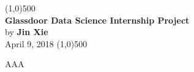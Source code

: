 \documentclass[12pt]{report}
\begin{document}
\begin{center}
\line(1,0){500}\\
\Large{\textbf{Glassdoor Data Science Internship Project}}\\[2pt]
\large{by \textbf{Jin Xie}}\\[4pt]
\small{April 9, 2018}
\line(1,0){500}
\end{center}

AAA
\end{document}
